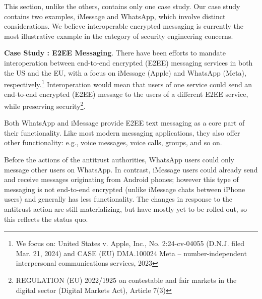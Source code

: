 \documentclass[letterpaper,twocolumn,10pt]{article}
\newcommand{\subh}[1]{\smallskip \noindent \textbf{{#1}}.}
\renewcommand{\paragraph}[1]{\subh{#1}}
\begin{document}
This section, unlike the others, contains only one case study. Our case study contains two examples, iMessage and WhatsApp, which involve distinct considerations. We believe interoperable encrypted messaging is currently the most illustrative example in the category of security engineering concerns.

\paragraph{Case Study \thecasestudy: E2EE Messaging}
\label{sec:case-studies:messaging}
There have been efforts to mandate interoperation between end-to-end encrypted (E2EE) messaging services in both the US and the EU, with a focus on iMessage (Apple) and WhatsApp (Meta), respectively.\footnote{We focus on: United States v. Apple, Inc., No. 2:24-cv-04055 (D.N.J. filed Mar. 21, 2024) and CASE (EU) DMA.100024 Meta – number-independent
interpersonal communications services, 2023\label{fn:cases}} Interoperation would mean that users of one service could send an end-to-end encrypted (E2EE) message to the users of a different E2EE service, while preserving security\footnote{REGULATION (EU) 2022/1925 on contestable and fair markets in the digital sector (Digital Markets Act), Article 7(3) }. 

Both WhatsApp and iMessage provide E2EE text messaging as a core part of their functionality. Like most modern messaging applications, they also offer other functionality: e.g., voice messages, voice calls, groups, and so on.

Before the actions of the antitrust authorities, WhatsApp users could only message other users on WhatsApp.  In contrast, iMessage users could already send and receive messages originating from Android phones; however this type of messaging is not end-to-end encrypted (unlike iMessage chats between iPhone users) and generally has less functionality.  The changes in response to the antitrust action are still materializing, but have mostly yet to be rolled out, so this reflects the status quo.   
\end{document}
